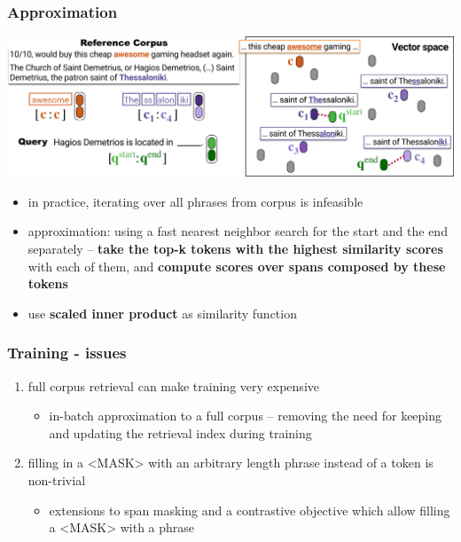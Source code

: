 \documentclass{beamer}
\begin{document}
\begin{frame}
    \frametitle{Approximation}
    \begin{center}
        \includegraphics[scale=0.8]{img/npm2.png}
    \end{center}
    \begin{itemize}
        \footnotesize
        \item in practice, iterating over all phrases from corpus is infeasible
        \item approximation: using a fast nearest neighbor search for the start and the end separately -- \textbf{take the top-k tokens with the highest
similarity scores} with each of them, and \textbf{compute
scores over spans composed by these tokens}
        \item use \textbf{scaled inner product} as similarity function
    \end{itemize}
\end{frame}

\begin{frame}
    \frametitle{Training - issues}
    \begin{enumerate}
        \footnotesize
        \item full corpus retrieval can make training very expensive
        \begin{itemize}
            \item in-batch approximation to a full corpus -- removing the need for keeping and updating the retrieval index during training
        \end{itemize}

        \item filling in a <MASK> with an arbitrary length phrase instead of a token is non-trivial
        \begin{itemize}
            \item extensions to span masking and a contrastive objective which allow filling a <MASK> with a phrase
        \end{itemize}
    \end{enumerate}
\end{frame}
\end{document}
